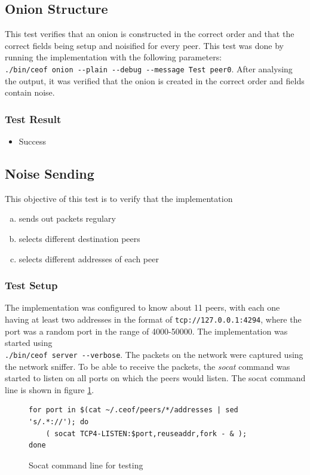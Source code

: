 \subsection{Onion Structure}
This test verifies that an onion is constructed in the correct order and that
the correct fields being setup and noisified for every peer.
This test was done by running the implementation with the following
parameters:\\ \verb=./bin/ceof onion --plain --debug --message Test peer0=.
After analysing the output, it was verified that the onion is created in the
correct order and fields contain noise.
\subsubsection{Test Result}
\begin{itemize}
\item Success
\end{itemize}
\subsection{Noise Sending}
\label{testnoisesending}
This objective of this test is to verify that the implementation
\begin{enumerate}[(a)]
\item sends out packets regulary 
\item selects different destination peers
\item selects different addresses of each peer
\end{enumerate}
\subsubsection{Test Setup}
The implementation was configured to know about 11 peers,
with each one having at least two addresses in the format
of \verb=tcp://127.0.0.1:4294=, where the port was a random
port in the range of 4000-50000.
The implementation was started using
\\ \verb=./bin/ceof server --verbose=. The packets
on the network were captured using the network sniffer.
To be able to receive the packets, the \textit{socat} command was started
to listen on all ports on which the peers would listen. The
socat command line is shown in figure \ref{socatlisten}.
\begin{figure}[htbp]
\caption{Socat command line for testing}
\label{socatlisten}
\begin{verbatim}
for port in $(cat ~/.ceof/peers/*/addresses | sed 's/.*://'); do
    ( socat TCP4-LISTEN:$port,reuseaddr,fork - & );
done
\end{verbatim}
\end{figure}
